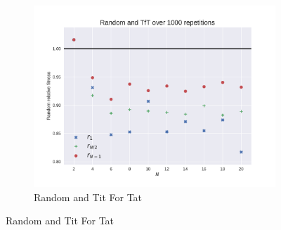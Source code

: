\documentclass{article}
\begin{document}
\begin{figure}[!hbtp]
\begin{subfigure}[t]{.3\textwidth}
        \includegraphics[width=.8\textwidth]{./img/Random_v_TfT_fitness.pdf}
        \caption{Random and Tit For Tat}
    \end{subfigure}%


\end{figure}
\end{document}
